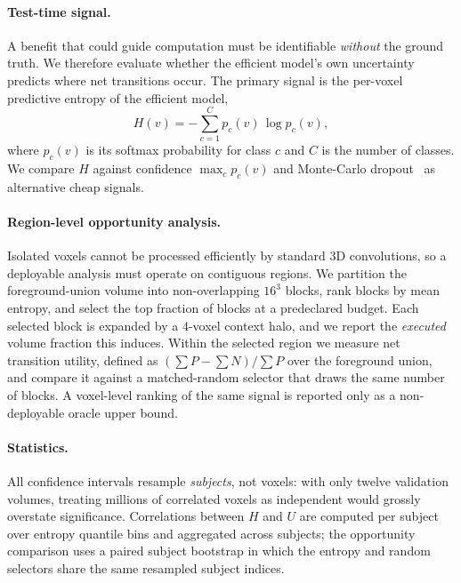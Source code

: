 \paragraph{Test-time signal.}
A benefit that could guide computation must be identifiable \emph{without} the
ground truth.  We therefore evaluate whether the efficient model's own
uncertainty predicts where net transitions occur.  The primary signal is the
per-voxel predictive entropy of the efficient model,
\begin{equation}
H(v) = -\sum_{c=1}^{C} p_c(v)\,\log p_c(v),
\label{eq:entropy}
\end{equation}
where $p_c(v)$ is its softmax probability for class $c$ and $C$ is the number of
classes.  We compare $H$ against confidence $\max_c p_c(v)$ and Monte-Carlo
dropout~\cite{gal2016dropout} as alternative cheap signals.

\paragraph{Region-level opportunity analysis.}
Isolated voxels cannot be processed efficiently by standard 3D convolutions, so
a deployable analysis must operate on contiguous regions.  We partition the
foreground-union volume into non-overlapping $16^3$ blocks, rank blocks by mean
entropy, and select the top fraction of blocks at a predeclared budget.  Each
selected block is expanded by a $4$-voxel context halo, and we report the
\emph{executed} volume fraction this induces.  Within the selected region we
measure net transition utility, defined as $(\sum P - \sum N)/\sum P$ over the
foreground union, and compare it against a matched-random selector that draws
the same number of blocks.  A voxel-level ranking of the same signal is reported
only as a non-deployable oracle upper bound.

\paragraph{Statistics.}
All confidence intervals resample \emph{subjects}, not voxels: with only twelve
validation volumes, treating millions of correlated voxels as independent would
grossly overstate significance.  Correlations between $H$ and $U$ are computed
per subject over entropy quantile bins and aggregated across subjects; the
opportunity comparison uses a paired subject bootstrap in which the entropy and
random selectors share the same resampled subject indices.
